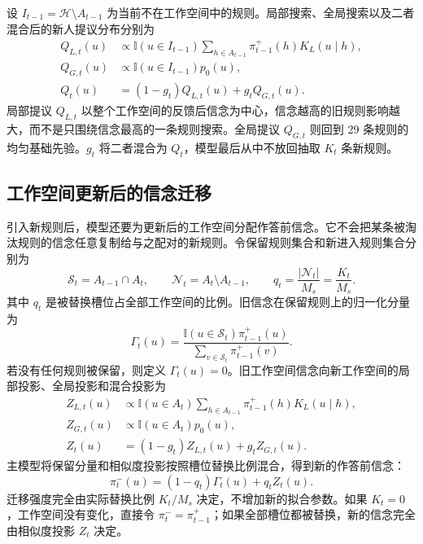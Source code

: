 \documentclass[12pt]{article}
\newcommand{\ind}{\mathbb I}
\begin{document}
设 $I_{t-1}=\mathcal H\setminus A_{t-1}$ 为当前不在工作空间中的规则。局部搜索、全局搜索以及二者混合后的新人提议分布分别为
\begin{align}
Q_{L,t}(u)
&\propto
\ind(u\in I_{t-1})
\sum_{h\in A_{t-1}}
\pi_{t-1}^{+}(h)K_L(u\mid h),
\nonumber\\
Q_{G,t}(u)
&\propto
\ind(u\in I_{t-1})p_0(u),
\nonumber\\
Q_t(u)
&=(1-g_t)Q_{L,t}(u)+g_tQ_{G,t}(u).
\label{eq:newcomer-proposal}
\end{align}
局部提议 $Q_{L,t}$ 以整个工作空间的反馈后信念为中心，信念越高的旧规则影响越大，而不是只围绕信念最高的一条规则搜索。全局提议 $Q_{G,t}$ 则回到 29 条规则的均匀基础先验。$g_t$ 将二者混合为 $Q_t$，模型最后从中不放回抽取 $K_t$ 条新规则。

\subsection{工作空间更新后的信念迁移}

引入新规则后，模型还要为更新后的工作空间分配作答前信念。它不会把某条被淘汰规则的信念任意复制给与之配对的新规则。令保留规则集合和新进入规则集合分别为
\begin{equation}
\mathcal S_t=A_{t-1}\cap A_t,
\qquad
\mathcal N_t=A_t\setminus A_{t-1},
\qquad
q_t=\frac{|\mathcal N_t|}{M_s}=\frac{K_t}{M_s}.
\label{eq:transport-fraction}
\end{equation}
其中 $q_t$ 是被替换槽位占全部工作空间的比例。旧信念在保留规则上的归一化分量为
\begin{equation}
\Gamma_t(u)
=
\frac{
\ind(u\in\mathcal S_t)\pi_{t-1}^{+}(u)
}{
\sum_{v\in\mathcal S_t}\pi_{t-1}^{+}(v)
}.
\label{eq:survivor-carryover}
\end{equation}
若没有任何规则被保留，则定义 $\Gamma_t(u)=0$。旧工作空间信念向新工作空间的局部投影、全局投影和混合投影为
\begin{align}
Z_{L,t}(u)
&\propto
\ind(u\in A_t)
\sum_{h\in A_{t-1}}
\pi_{t-1}^{+}(h)K_L(u\mid h),
\nonumber\\
Z_{G,t}(u)
&\propto
\ind(u\in A_t)p_0(u),
\nonumber\\
Z_t(u)
&=(1-g_t)Z_{L,t}(u)+g_tZ_{G,t}(u).
\label{eq:semantic-projection}
\end{align}
主模型将保留分量和相似度投影按照槽位替换比例混合，得到新的作答前信念：
\begin{equation}
\boxed{
\pi_t^{-}(u)
=(1-q_t)\Gamma_t(u)+q_tZ_t(u)
}.
\label{eq:similarity-transport}
\end{equation}
迁移强度完全由实际替换比例 $K_t/M_s$ 决定，不增加新的拟合参数。如果 $K_t=0$，工作空间没有变化，直接令 $\pi_t^{-}=\pi_{t-1}^{+}$；如果全部槽位都被替换，新的信念完全由相似度投影 $Z_t$ 决定。
\end{document}
